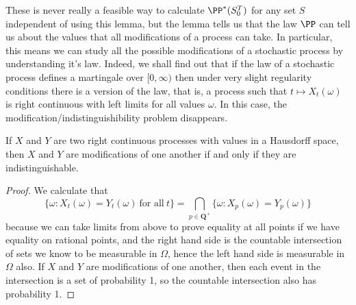 These is never really a feasible way to calculate $\PP^*(S_0^T)$ for any set $S$ independent of using this lemma, but the lemma tells us that the law $\PP$ can tell us about the values that all modifications of a process can take. In particular, this means we can study all the possible modifications of a stochastic process by understanding it's law. Indeed, we shall find out that if the law of a stochastic process defines a martingale over $[0,\infty)$ then under very slight regularity conditions there is a \emph{\cadlag} version of the law, that is, a process such that $t \mapsto X_t(\omega)$ is right continuous with left limits for all values $\omega$. In this case, the modification/indistinguishibility problem disappears.

\begin{theorem}
    If $X$ and $Y$ are two right continuous processes with values in a Hausdorff space, then $X$ and $Y$ are modifications of one another if and only if they are indistinguishable.
\end{theorem}
\begin{proof}
    We calculate that
    \[ \{ \omega:  X_t(\omega) = Y_t(\omega)\ \text{for all}\ t \} = \bigcap_{p \in \mathbf{Q}^+} \{ \omega: X_p(\omega) = Y_p(\omega) \} \]
    because we can take limits from above to prove equality at all points if we have equality on rational points, and the right hand side is the countable intersection of sets we know to be measurable in $\Omega$, hence the left hand side is measurable in $\Omega$ also. If $X$ and $Y$ are modifications of one another, then each event in the intersection is a set of probability 1, so the countable intersection also has probability 1.
\end{proof}


